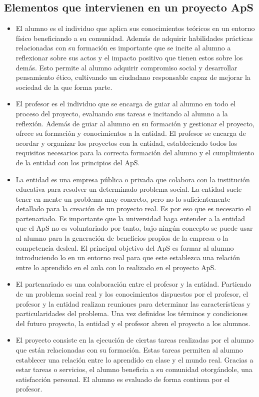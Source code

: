 \documentclass[11pt]{article}
\begin{document}
\subsection{Elementos que intervienen en un proyecto ApS}
\begin{itemize} 
	\item El alumno es el individuo que aplica sus conocimientos teóricos en un entorno físico beneficiando a su comunidad. Además de adquirir habilidades prácticas relacionadas con su formación es importante que se incite al alumno a reflexionar sobre sus actos y el impacto positivo que tienen estos sobre los demás. Esto permite al alumno adquirir compromiso social y desarrollar pensamiento ético, cultivando un ciudadano responsable capaz de mejorar la sociedad de la que forma parte.
	\item El profesor es el individuo que se encarga de guiar al alumno en todo el proceso del proyecto, evaluando sus tareas e incitando al alumno a la reflexión. Además de guiar al alumno en su formación y gestionar el proyecto, ofrece su formación y conocimientos a la entidad. El profesor se encarga de acordar y organizar los proyectos con la entidad, estableciendo todos los requisitos necesarios para la correcta formación del alumno y el cumplimiento de la entidad con los principios del ApS.
	\item La entidad es una empresa pública o privada que colabora con la institución educativa para resolver un determinado problema social. La entidad suele tener en mente un problema muy concreto, pero no lo suficientemente detallado para la creación de un proyecto real. Es por eso que es necesario el partenariado. Es importante que la universidad haga entender a la entidad que el ApS no es voluntariado por tanto, bajo ningún concepto se puede usar al alumno para la generación de beneficios propios de la empresa o la competencia desleal. El principal objetivo del ApS es formar al alumno introduciendo lo en un entorno real para que este establezca una relación entre lo aprendido en el aula con lo realizado en el proyecto ApS.
	\item El partenariado es una colaboración entre el profesor y la entidad. Partiendo de un problema social real y los conocimientos dispuestos por el profesor, el profesor y la entidad realizan reuniones para determinar las características y particularidades del problema. Una vez definidos los términos y condiciones del futuro proyecto, la entidad y el profesor abren el proyecto a los alumnos.
	\item El proyecto consiste en la ejecución de ciertas tareas realizadas por el alumno que están relacionadas con su formación. Estas tareas permiten al alumno establecer una relación entre lo aprendido en clase y el mundo real. Gracias a estar tareas o servicios, el alumno beneficia a su comunidad otorgándole, una satisfacción personal. El alumno es evaluado de forma continua por el profesor.
\end{itemize}
\end{document}
